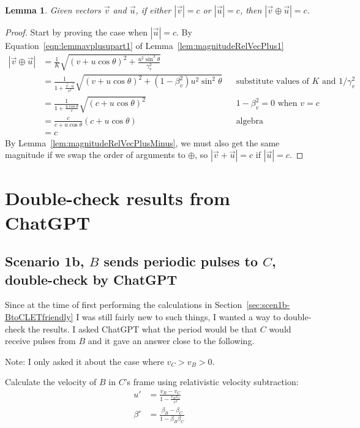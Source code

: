 \documentclass[a4paper]{article}
\theoremstyle{plain}
\newtheorem{lemma}[theorem]{Lemma}
\theoremstyle{definition}
\newcommand{\vect}[1]{\vec{#1}}
\begin{document}
\begin{lemma}
\label{lem:magVplusC}
Given vectors $\vect{v}$ and $\vect{u}$,
if either $|\vect{v}|=c$ or $|\vect{u}|=c$,
then $|\vect{v} \oplus \vect{u}|=c$.
\end{lemma}

\begin{proof}
Start by proving the case when $|\vect{u}|=c$.
By Equation~\eqref{eqn:lemmavplusupart1}
of Lemma~\ref{lem:magnitudeRelVecPlus1}
\begin{align*}
|\vect{v} \oplus \vect{u}|
  & = \frac{1}{K} \sqrt{(v + u \cos \theta)^2 + \frac{u^2 \sin^2 \theta}{\gamma_v^2}} \\
  & = \frac{1}{1+\frac{\vect{v} \cdot \vect{u}}{c^2}} \sqrt{(v + u \cos \theta)^2 + (1-\beta_v^2) u^2 \sin^2 \theta} & & \text{substitute values of $K$ and $1/\gamma_v^2$} \\
  & = \frac{1}{1+\frac{u \cos \theta}{c}} \sqrt{(c + u \cos \theta)^2} & & \text{$1-\beta_v^2 = 0$ when $v=c$} \\
  & = \frac{c}{c + u \cos \theta} (c + u \cos \theta) & & \text{algebra} \\
  & = c
\end{align*}
By Lemma~\ref{lem:magnitudeRelVecPlusMinus}, we must also get the same
magnitude if we swap the order of arguments to $\oplus$, so
$|\vect{v}+\vect{u}|=c$ if $|\vect{u}|=c$.
\end{proof}


\section{Double-check results from ChatGPT}


\subsection{Scenario 1b, $B$ sends periodic pulses to $C$, double-check by ChatGPT}
\label{sec:scen1b-BtoCdoublecheck}

Since at the time of first performing the calculations in
Section~\ref{sec:scen1b-BtoCLETfriendly} I was still fairly new to
such things, I wanted a way to double-check the results.  I asked
ChatGPT what the period would be that $C$ would receive pulses from
$B$ and it gave an answer close to the following.

Note: I only asked it about the case where $v_C > v_B > 0$.

Calculate the velocity of $B$ in $C$'s frame using relativistic
velocity subtraction:
\begin{align}
u' & = \frac{v_B - v_C}{1 - \frac{v_B v_C}{c^2}} \\
\beta' & = \frac{\beta_B - \beta_C}{1 - \beta_B \beta_C}
\end{align}
\end{document}
